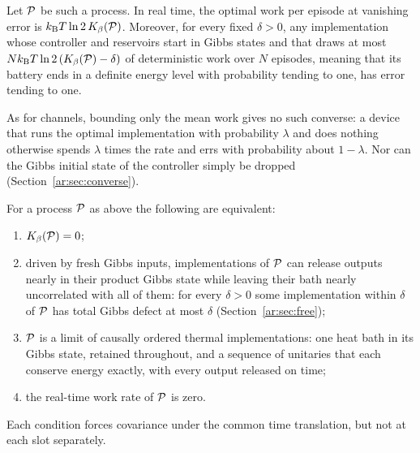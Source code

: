 \begin{theorem}\label{ar:thm:law}
Let $\mathcal P$ be such a process. In real time, the optimal work per episode at vanishing error is $k_{\mathrm B} T\ln2\,K_\beta(\mathcal P)$. Moreover, for every fixed $\delta>0$, any implementation whose controller and reservoirs start in Gibbs states and that draws at most $Nk_{\mathrm B} T\ln2\,(K_\beta(\mathcal P)-\delta)$ of deterministic work over $N$ episodes, meaning that its battery ends in a definite energy level with probability tending to one, has error tending to one.
\end{theorem}

As for channels, bounding only the mean work gives no such converse: a device that runs the optimal implementation with probability $\lambda$ and does nothing otherwise spends $\lambda$ times the rate and errs with probability about $1-\lambda$. Nor can the Gibbs initial state of the controller simply be dropped (Section~\ref{ar:sec:converse}).

\begin{theorem}\label{ar:thm:free}
For a process $\mathcal P$ as above the following are equivalent:
\begin{enumerate}[label=(\roman*)]
\item $K_\beta(\mathcal P)=0$;
\item driven by fresh Gibbs inputs, implementations of $\mathcal P$ can release outputs nearly in their product Gibbs state while leaving their bath nearly uncorrelated with all of them: for every $\delta>0$ some implementation within $\delta$ of $\mathcal P$ has total Gibbs defect at most $\delta$ (Section~\ref{ar:sec:free});
\item $\mathcal P$ is a limit of causally ordered thermal implementations: one heat bath in its Gibbs state, retained throughout, and a sequence of unitaries that each conserve energy exactly, with every output released on time;
\item the real-time work rate of $\mathcal P$ is zero.
\end{enumerate}
Each condition forces covariance under the common time translation, but not at each slot separately.
\end{theorem}

